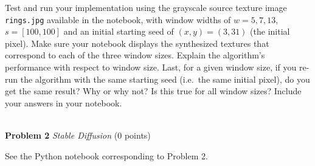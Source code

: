 \documentclass[11pt]{article}
\newcommand{\hwproblem}[2] {\noindent \\ {\bf #1} {\it #2}}
\begin{document}
Test and run your implementation using the grayscale source texture image \texttt{rings.jpg} available in the notebook, with window widths of $w = 5, 7, 13$, $s=[100, 100]$ and an initial starting seed of $(x, y) = (3, 31)$ (the initial pixel). Make sure your notebook displays the synthesized textures that correspond to each of the three window sizes. Explain the algorithm's performance with respect to window size. Last, for a given window size, if you re-run the algorithm with the same starting seed (i.e.\ the same initial pixel), do you get the same result? Why or why not? Is this true for all window sizes? Include your answers in your notebook.


\hwproblem{Problem 2}{Stable Diffusion}  (0 points)

See the Python notebook corresponding to Problem 2.




\end{document}
